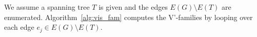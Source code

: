 \documentclass[fleqn,11pt]{article}
\begin{document}

We assume a spanning tree $T$ is given and the edges $E(G)\setminus E(T)$ are enumerated. 
Algorithm~\ref{alg:vis_fam} computes the V'-families by looping over each edge $e_j\in E(G)\setminus E(T)$.

\end{document}

